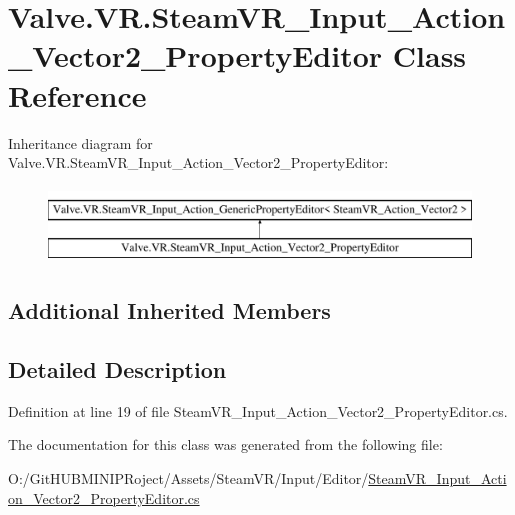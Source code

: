 \hypertarget{class_valve_1_1_v_r_1_1_steam_v_r___input___action___vector2___property_editor}{}\section{Valve.\+V\+R.\+Steam\+V\+R\+\_\+\+Input\+\_\+\+Action\+\_\+\+Vector2\+\_\+\+Property\+Editor Class Reference}
\label{class_valve_1_1_v_r_1_1_steam_v_r___input___action___vector2___property_editor}
Inheritance diagram for Valve.\+V\+R.\+Steam\+V\+R\+\_\+\+Input\+\_\+\+Action\+\_\+\+Vector2\+\_\+\+Property\+Editor\+:\begin{figure}[H]
\begin{center}
\leavevmode
\includegraphics[height=2.000000cm]{class_valve_1_1_v_r_1_1_steam_v_r___input___action___vector2___property_editor}
\end{center}
\end{figure}
\subsection*{Additional Inherited Members}


\subsection{Detailed Description}


Definition at line 19 of file Steam\+V\+R\+\_\+\+Input\+\_\+\+Action\+\_\+\+Vector2\+\_\+\+Property\+Editor.\+cs.



The documentation for this class was generated from the following file\+:\begin{DoxyCompactItemize}
\item 
O\+:/\+Git\+H\+U\+B\+M\+I\+N\+I\+P\+Roject/\+Assets/\+Steam\+V\+R/\+Input/\+Editor/\mbox{\hyperlink{_steam_v_r___input___action___vector2___property_editor_8cs}{Steam\+V\+R\+\_\+\+Input\+\_\+\+Action\+\_\+\+Vector2\+\_\+\+Property\+Editor.\+cs}}\end{DoxyCompactItemize}
